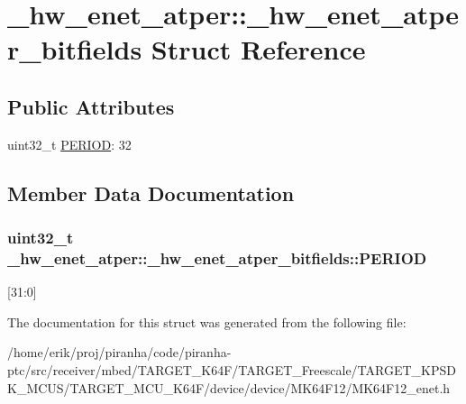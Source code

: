 \hypertarget{struct__hw__enet__atper_1_1__hw__enet__atper__bitfields}{}\section{\+\_\+hw\+\_\+enet\+\_\+atper\+:\+:\+\_\+hw\+\_\+enet\+\_\+atper\+\_\+bitfields Struct Reference}
\label{struct__hw__enet__atper_1_1__hw__enet__atper__bitfields}
\subsection*{Public Attributes}
\begin{DoxyCompactItemize}
\item 
uint32\+\_\+t \hyperlink{struct__hw__enet__atper_1_1__hw__enet__atper__bitfields_ac1512422edebe7131ceb9ef4ddc5a4fc}{P\+E\+R\+I\+OD}\+: 32
\end{DoxyCompactItemize}


\subsection{Member Data Documentation}
\subsubsection[{\texorpdfstring{P\+E\+R\+I\+OD}{PERIOD}}]{\setlength{\rightskip}{0pt plus 5cm}uint32\+\_\+t \+\_\+hw\+\_\+enet\+\_\+atper\+::\+\_\+hw\+\_\+enet\+\_\+atper\+\_\+bitfields\+::\+P\+E\+R\+I\+OD}\hypertarget{struct__hw__enet__atper_1_1__hw__enet__atper__bitfields_ac1512422edebe7131ceb9ef4ddc5a4fc}{}\label{struct__hw__enet__atper_1_1__hw__enet__atper__bitfields_ac1512422edebe7131ceb9ef4ddc5a4fc}
\mbox{[}31\+:0\mbox{]} 

The documentation for this struct was generated from the following file\+:\begin{DoxyCompactItemize}
\item 
/home/erik/proj/piranha/code/piranha-\/ptc/src/receiver/mbed/\+T\+A\+R\+G\+E\+T\+\_\+\+K64\+F/\+T\+A\+R\+G\+E\+T\+\_\+\+Freescale/\+T\+A\+R\+G\+E\+T\+\_\+\+K\+P\+S\+D\+K\+\_\+\+M\+C\+U\+S/\+T\+A\+R\+G\+E\+T\+\_\+\+M\+C\+U\+\_\+\+K64\+F/device/device/\+M\+K64\+F12/M\+K64\+F12\+\_\+enet.\+h\end{DoxyCompactItemize}
